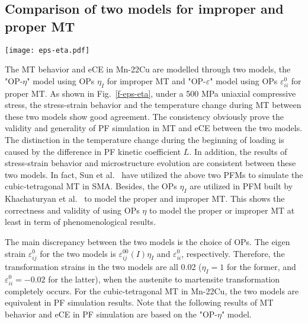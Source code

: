 \documentclass[reprint,3p,sort&compress,times,onecolumn]{elsarticle}
\begin{document}
\subsection{Comparison of two models  for improper and proper MT}
\begin{figure*}[!t]
\centering
  \texttt{[image: eps-eta.pdf]}
  \caption{(a) Stress-strain behaviors and (b) temperature change evolution under different temperatures by using the two models. "OP-$\eta$" represents PFM with OPs $\eta$ (improper MT) and "OP-$\varepsilon$" PFM with OPs $\varepsilon_{ii}^0$ (proper MT).} \label{f-eps-eta}
\end{figure*}

The MT behavior and eCE in Mn-22Cu are modelled through two models, the "OP-$\eta$" model using OPs $\eta_I$ for improper MT and "OP-$\varepsilon$" model using OPs $\varepsilon_{ii}^0$ for proper MT.
As shown in Fig.~\ref{f-eps-eta},
under a 500 MPa uniaxial compressive stress, the stress-strain behavior and the temperature change during MT between these two models show good agreement.
The consistency obviously prove the validity and generality of PF simulation in MT and eCE between the two models. The distinction in the temperature change during the beginning of loading is caused by the difference in PF kinetic coefficient $L$.  
In addition, the results of stress-strain behavior and microstructure evolution are consistent between these two models. In fact, Sun et al.~\cite{sun2018phase,sun2019non} have utilized the above two PFMs to simulate the cubic-tetragonal MT in SMA.
Besides, the OPs $\eta_I$ are utilized in PFM built by Khachaturyan et al.~\cite{Khachaturyan1997Three,Artemev2000Phase,artemev2001three} to model the proper and improper MT. %
This shows the correctness and validity of using OPs $\eta$ to model the proper or improper MT at least in term of phenomenological results.

The main discrepancy between the two models is the choice of OPs. 
The eigen strain $\varepsilon_{ij}^0$ for the two models is $\varepsilon_{ij}^{00}(I) \eta_I$ and $\varepsilon_{ii}^0$, respectively. Therefore, the transformation strains in the two models are all 0.02 ($\eta_I=1$ for the former, and $\varepsilon_{ii}^0=-0.02$ for the latter), when the austenite to martensite transformation completely occurs.
For the cubic-tetragonal MT in Mn-22Cu, the two models are equivalent in PF simulation results. Note that the following results of MT behavior and eCE in PF simulation are based on the "OP-$\eta$" model.
\end{document}
